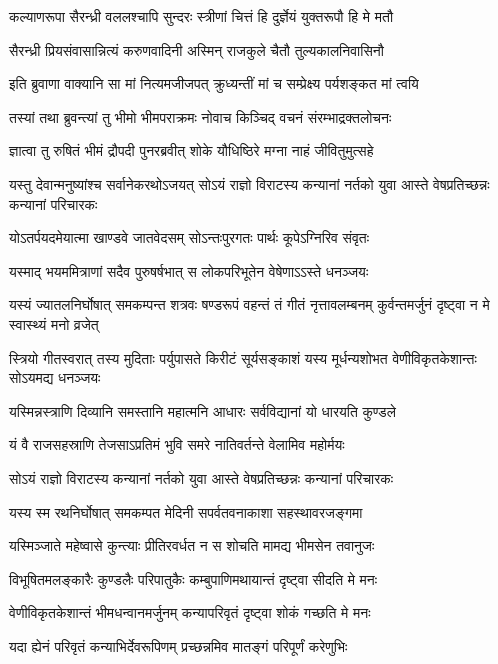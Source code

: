 \twolineshloka
{कल्याणरूपा सैरन्ध्री वललश्चापि सुन्दरः}
{स्त्रीणां चित्तं हि दुर्ज्ञेयं युक्तरूपौ हि मे मतौ}


\twolineshloka
{सैरन्ध्री प्रियसंवासान्नित्यं करुणवादिनी}
{अस्मिन् राजकुले चैतौ तुल्यकालनिवासिनौ}


\twolineshloka
{इति ब्रुवाणा वाक्यानि सा मां नित्यमजीजपत्}
{क्रुध्यन्तीं मां च सम्प्रेक्ष्य पर्यशङ्कत मां त्वयि}


\twolineshloka
{तस्यां तथा ब्रुवन्त्यां तु भीमो भीमपराक्रमः}
{नोवाच किञ्चिद् वचनं संरम्भाद्रक्तलोचनः}


\twolineshloka
{ज्ञात्वा तु रुषितं भीमं द्रौपदी पुनरब्रवीत्}
{शोके यौधिष्ठिरे मग्ना नाहं जीवितुमुत्सहे}


\threelineshloka
{यस्तु देवान्मनुष्यांश्च सर्वानेकरथोऽजयत्}
{सोऽयं राज्ञो विराटस्य कन्यानां नर्तको युवा}
{आस्ते वेषप्रतिच्छन्नः कन्यानां परिचारकः}


\twolineshloka
{योऽतर्पयदमेयात्मा खाण्डवे जातवेदसम्}
{सोऽन्तःपुरगतः पार्थः कूपेऽग्निरिव संवृतः}


\twolineshloka
{यस्माद् भयममित्राणां सदैव पुरुषर्षभात्}
{स लोकपरिभूतेन वेषेणाऽऽस्ते धनञ्जयः}


\threelineshloka
{यस्यं ज्यातलनिर्घोषात् समकम्पन्त शत्रवः}
{षण्डरूपं वहन्तं तं गीतं नृत्तावलम्बनम्}
{कुर्वन्तमर्जुनं दृष्ट्वा न मे स्वास्थ्यं मनो व्रजेत्}


\onelineshloka
{स्त्रियो गीतस्वरात् तस्य मुदिताः पर्युपासते}
\twolineshloka
{किरीटं सूर्यसङ्काशं यस्य मूर्धन्यशोभत}
{वेणीविकृतकेशान्तः सोऽयमद्य धनञ्जयः}


\twolineshloka
{यस्मिन्नस्त्राणि दिव्यानि समस्तानि महात्मनि}
{आधारः सर्वविद्यानां यो धारयति कुण्डले}


\twolineshloka
{यं वै राजसहस्राणि तेजसाऽप्रतिमं भुवि}
{समरे नातिवर्तन्ते वेलामिव महोर्मयः}


\twolineshloka
{सोऽयं राज्ञो विराटस्य कन्यानां नर्तको युवा}
{आस्ते वेषप्रतिच्छन्नः कन्यानां परिचारकः}


\twolineshloka
{यस्य स्म रथनिर्घोषात् समकम्पत मेदिनी}
{सपर्वतवनाकाशा सहस्थावरजङ्गमा}


\twolineshloka
{यस्मिञ्जाते महेष्वासे कुन्त्याः प्रीतिरवर्धत}
{न स शोचति मामद्य भीमसेन तवानुजः}


\twolineshloka
{विभूषितमलङ्कारैः कुण्डलैः परिपातुकैः}
{कम्बुपाणिमथायान्तं दृष्ट्वा सीदति मे मनः}


\twolineshloka
{वेणीविकृतकेशान्तं भीमधन्वानमर्जुनम्}
{कन्यापरिवृतं दृष्ट्वा शोकं गच्छति मे मनः}


\twolineshloka
{यदा ह्येनं परिवृतं कन्याभिर्देवरूपिणम्}
{प्रच्छन्नमिव मातङ्गं परिपूर्णं करेणुभिः}


